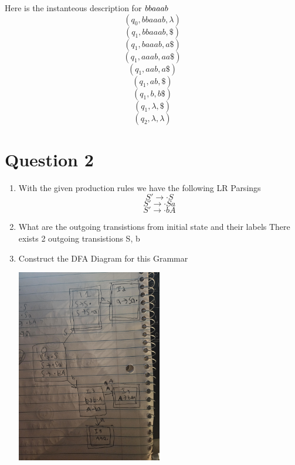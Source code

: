 \documentclass{article}
\begin{document}
    Here is the instanteous description for $bbaaab\\$
    \[\left(q_0, bbaaab, \lambda\right)\]
    \[\left(q_1, bbaaab, \$ \right)\]
    \[\left(q_1, baaab, a\$ \right)\]
    \[\left(q_1, aaab, aa\$ \right)\]
    \[\left(q_1, aab, a\$ \right)\]
    \[\left(q_1, ab, \$ \right)\]
    \[\left(q_1, b, b\$ \right)\]
    \[\left(q_1, \lambda, \$ \right)\]
    \[\left(q_2, \lambda, \lambda \right)\]

    \section*{Question 2}
    \begin{enumerate}
        \item With the given production rules we have the following LR Parsings
        \[ S' \rightarrow \cdot{} S\]
        \[ S' \rightarrow \cdot{} Sa\]
        \[ S' \rightarrow \cdot{} bA\]
        \item What are the outgoing transistions from initial state and their labels 
		There exists 2 outgoing transistions S, b
	\item Construct the DFA Diagram for this Grammar
	\begin{center}
            \includegraphics[width=0.5\textwidth, angle=0]{figures/DFA1.jpg}
	\end{center}
    	\end{enumerate}
\end{document}
